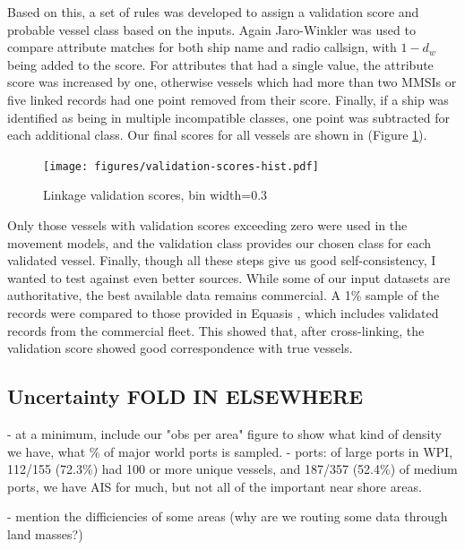 Based on this, a set of rules was developed to assign a validation score and probable vessel class based on the inputs.  Again Jaro-Winkler was used to compare attribute matches for both ship name and radio callsign, with $1 - d_w$ being added to the score. For attributes that had a single value, the attribute score was increased by one, otherwise vessels which had more than two MMSIs or five linked records had one point removed from their score. Finally, if a ship was identified as being in multiple incompatible classes, one point was subtracted for each additional class. Our final scores for all vessels are shown in (Figure \ref{fig:validation-score-hist}).

\begin{figure}[h!]
  \centering
    \texttt{[image: figures/validation-scores-hist.pdf]}
  \caption[Linkage validation scores]{Linkage validation scores, bin width=0.3}
  \label{fig:validation-score-hist}
\end{figure}

Only those vessels with validation scores exceeding zero were used in the movement models, and the validation class provides our chosen class for each validated vessel. Finally, though all these steps give us good self-consistency, I wanted to test against even better sources.  %
While some of our input datasets are authoritative, the best available data remains commercial. A 1\% sample of the records were compared to those provided in Equasis \citep{Equasis2011}, which includes validated records from the commercial fleet. This showed that, after cross-linking, the validation score showed good correspondence with true vessels.

\subsection{Uncertainty FOLD IN ELSEWHERE}

 - at a minimum, include our "obs per area" figure to show what kind of density we have, what \% of major world ports is sampled.
 - ports: of large ports in WPI, 112/155 (72.3\%) had 100 or more unique vessels, and 187/357 (52.4\%) of medium ports, we have AIS for much, but not all of the important near shore areas.

 - 
mention the difficiencies of some areas (why are we routing some data through land masses?)
